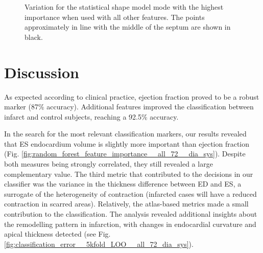 \documentclass{llncs}
\begin{document}
	\begin{figure}[]		
\begin{center}   
\qquad
{}


\caption{ Variation for the statistical shape model mode with the highest importance when used with all other features. The points approximately in line with the middle of the septum are shown in black. }
\label{fig:visualise_shapes}
\end{center}
		\end{figure}

\section{Discussion}

As expected according to clinical practice, ejection fraction proved to be a robust marker (87\% accuracy). Additional features improved the classification between infarct and control subjects, reaching a 92.5\% accuracy. 

In the search for the most relevant classification markers, our results revealed that ES endocardium volume is slightly more important than ejection fraction (Fig. \ref{fig:random_forest_feature_importance__all_72__dia_sys}). Despite both measures being strongly correlated, they still revealed a large complementary value. The third metric that contributed to the decisions in our classifier was the variance in the thickness difference between ED and ES, a surrogate of the heterogeneity of contraction (infarcted cases will have a reduced contraction in scarred areas). Relatively, the atlas-based metrics made a small contribution to the classification. The analysis revealed additional insights about the remodelling pattern in infarction, with changes in endocardial curvature and apical thickness detected (see Fig. \ref{fig:classification_error__5kfold_LOO__all_72_dia_sys}).
\end{document}
